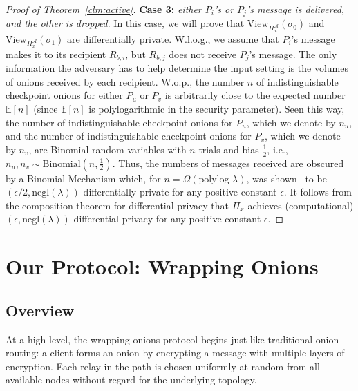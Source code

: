 \begin{proof} [Proof of Theorem~\ref{clm:active}]
\textbf{Case 3:} \textit{either $P_i$'s or $P_j$'s message is delivered, and the other is dropped}. In this case, we will prove that $\text{View}_{\Pi_x^{\mathcal{A}}}(\sigma_0)$ and $\text{View}_{\Pi_x^{\mathcal{A}}}(\sigma_1)$ are differentially private. W.l.o.g., we assume that $P_i$'s message makes it to its recipient $R_{b,i}$, but $R_{b,j}$ does not receive $P_j$'s message. The only information the adversary has to help determine the input setting is the volumes of onions received by each recipient. W.o.p., the number $n$ of indistinguishable checkpoint onions for either $P_u$ or $P_v$ is arbitrarily close to the expected number $\mathbb{E}[n]$ (since $\mathbb{E}[n]$ is polylogarithmic in the security parameter). Seen this way, the number of indistinguishable checkpoint onions for $P_u$, which we denote by $n_u$, and the number of indistinguishable checkpoint onions for $P_v$, which we denote by $n_v$, are Binomial random variables with $n$ trials and bias $\frac{1}{2}$, i.e., $n_u, n_v \sim \text{Binomial}(n, \frac{1}{2})$. Thus, the numbers of messages received are obscured by a Binomial Mechanism which, for $n = \Omega(\text{polylog } \lambda)$, was shown~\cite{EC:DKMMN06} to be $(\epsilon/2, \text{negl}(\lambda))$-differentially private for any positive constant $\epsilon$. It follows from the composition theorem for differential privacy that $\Pi_x$ achieves (computational) $(\epsilon, \text{negl}(\lambda))$-differential privacy for any positive constant $\epsilon$. 

\end{proof}

\newpage

 

\section{Our Protocol: Wrapping Onions} \label{sec:woes}

\subsection{Overview}

At a high level, the wrapping onions protocol begins just like traditional onion routing: a client forms an onion by encrypting a message with multiple layers of encryption. Each relay in the path is chosen uniformly at random from all available nodes without regard for the underlying topology. 

